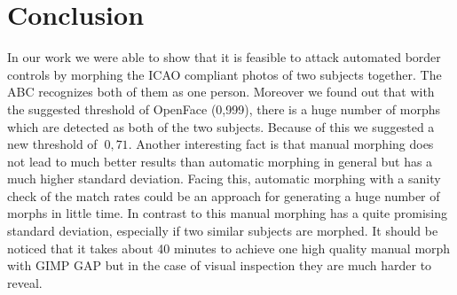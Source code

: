\section{Conclusion}
\label{Conclusion}
In our work we were able to show that it is feasible to attack automated border controls by morphing the ICAO compliant photos of two subjects together. The ABC recognizes both of them as one person. Moreover we found out that with the suggested threshold of OpenFace (0,999), there is a huge number of morphs which are detected as both of the two subjects. Because of this we suggested a new threshold of $~0,71$. 
Another interesting fact is that manual morphing does not lead to much better results than automatic morphing in general but has a much higher standard deviation. Facing this, automatic morphing with a sanity check of the match rates could be an approach for generating a huge number of morphs in little time. 
In contrast to this manual morphing has a quite promising standard deviation, especially if two similar subjects are morphed. It should be noticed that it takes about 40 minutes to achieve one high quality manual morph with GIMP GAP but in the case of visual inspection they are much harder to reveal.
